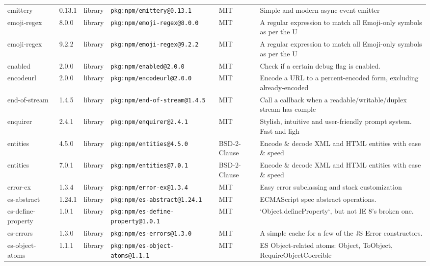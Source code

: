 \documentclass[11pt,a4paper]{article}
\begin{document}
\begin{longtable}{|p{4cm}|p{2cm}|p{1.6cm}|p{5cm}|p{1.5cm}|p{3.5cm}|}
\raggedright emittery & 0.13.1 & library & \small\texttt{pkg:npm/emittery@0.13.1} & MIT & \small Simple and modern async event emitter \\
\raggedright emoji-regex & 8.0.0 & library & \small\texttt{pkg:npm/emoji-regex@8.0.0} & MIT & \small A regular expression to match all Emoji-only symbols as per the U \\
\raggedright emoji-regex & 9.2.2 & library & \small\texttt{pkg:npm/emoji-regex@9.2.2} & MIT & \small A regular expression to match all Emoji-only symbols as per the U \\
\raggedright enabled & 2.0.0 & library & \small\texttt{pkg:npm/enabled@2.0.0} & MIT & \small Check if a certain debug flag is enabled. \\
\raggedright encodeurl & 2.0.0 & library & \small\texttt{pkg:npm/encodeurl@2.0.0} & MIT & \small Encode a URL to a percent-encoded form, excluding already-encoded \\
\raggedright end-of-stream & 1.4.5 & library & \small\texttt{pkg:npm/end-of-stream@1.4.5} & MIT & \small Call a callback when a readable/writable/duplex stream has comple \\
\raggedright enquirer & 2.4.1 & library & \small\texttt{pkg:npm/enquirer@2.4.1} & MIT & \small Stylish, intuitive and user-friendly prompt system. Fast and ligh \\
\raggedright entities & 4.5.0 & library & \small\texttt{pkg:npm/entities@4.5.0} & BSD-2-Clause & \small Encode \& decode XML and HTML entities with ease \& speed \\
\raggedright entities & 7.0.1 & library & \small\texttt{pkg:npm/entities@7.0.1} & BSD-2-Clause & \small Encode \& decode XML and HTML entities with ease \& speed \\
\raggedright error-ex & 1.3.4 & library & \small\texttt{pkg:npm/error-ex@1.3.4} & MIT & \small Easy error subclassing and stack customization \\
\raggedright es-abstract & 1.24.1 & library & \small\texttt{pkg:npm/es-abstract@1.24.1} & MIT & \small ECMAScript spec abstract operations. \\
\raggedright es-define-property & 1.0.1 & library & \small\texttt{pkg:npm/es-define-property@1.0.1} & MIT & \small `Object.defineProperty`, but not IE 8's broken one. \\
\raggedright es-errors & 1.3.0 & library & \small\texttt{pkg:npm/es-errors@1.3.0} & MIT & \small A simple cache for a few of the JS Error constructors. \\
\raggedright es-object-atoms & 1.1.1 & library & \small\texttt{pkg:npm/es-object-atoms@1.1.1} & MIT & \small ES Object-related atoms: Object, ToObject, RequireObjectCoercible \\

\end{longtable}
\end{document}
